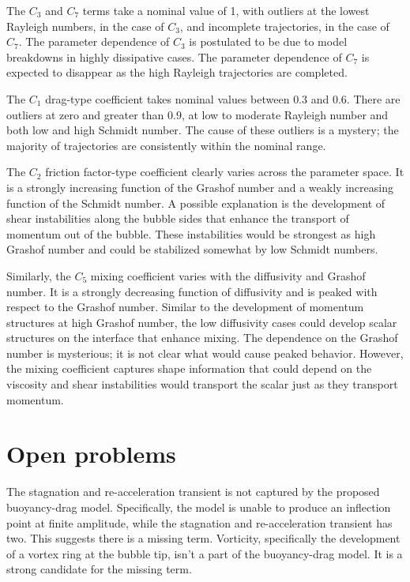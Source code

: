 The $C_3$ and $C_7$ terms take a nominal value of 1, with outliers at the lowest Rayleigh numbers, in the case of $C_3$, and incomplete trajectories, in the case of $C_7$.
The parameter dependence of $C_3$ is postulated to be due to model breakdowns in highly dissipative cases.
The parameter dependence of $C_7$ is expected to disappear as the high Rayleigh trajectories are completed.

The $C_1$ drag-type coefficient takes nominal values between $0.3$ and $0.6$.
There are outliers at zero and greater than $0.9$, at low to moderate Rayleigh number and both low and high Schmidt number.
The cause of these outliers is a mystery; the majority of trajectories are consistently within the nominal range.

The $C_2$ friction factor-type coefficient clearly varies across the parameter space.
It is a strongly increasing function of the Grashof number and a weakly increasing function of the Schmidt number.
A possible explanation is the development of shear instabilities along the bubble sides that enhance the transport of momentum out of the bubble.
These instabilities would be strongest as high Grashof number and could be stabilized somewhat by low Schmidt numbers.

Similarly, the $C_5$ mixing coefficient varies with the diffusivity and Grashof number.
It is a strongly decreasing function of diffusivity and is peaked with respect to the Grashof number.
Similar to the development of momentum structures at high Grashof number, the low diffusivity cases could develop scalar structures on the interface that enhance mixing.
The dependence on the Grashof number is mysterious; it is not clear what would cause peaked behavior.
However, the mixing coefficient captures shape information that could depend on the viscosity and shear instabilities would transport the scalar just as they transport momentum.


\section{Open problems}

The stagnation and re-acceleration transient is not captured by the proposed buoyancy-drag model.
Specifically, the model is unable to produce an inflection point at finite amplitude, while the stagnation and re-acceleration transient has two.
This suggests there is a missing term.
Vorticity, specifically the development of a vortex ring at the bubble tip, isn't a part of the buoyancy-drag model.
It is a strong candidate for the missing term.

